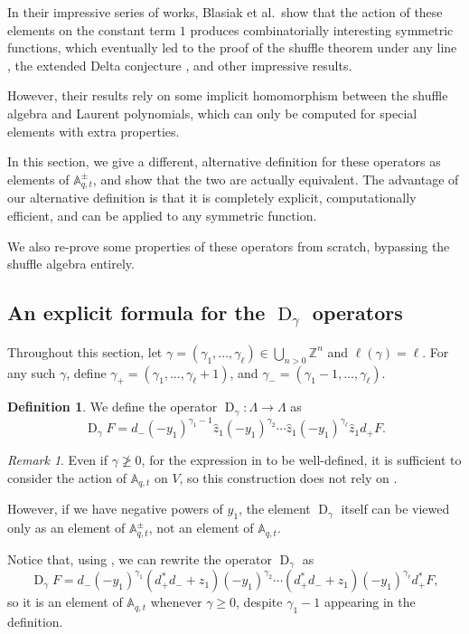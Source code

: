 \documentclass[reqno]{amsart}
\theoremstyle{plain}
\theoremstyle{definition}
\newtheorem{definition}[theorem]{Definition}
\theoremstyle{remark}
\newtheorem{remark}[theorem]{Remark}
\DeclareMathOperator{\D}{D}
\newcommand{\A}{\mathbb{A}}%
\newcommand{\z}{\widehat{z}}
\newcommand{\<}{\langle}
\renewcommand{\>}{\rangle}
\begin{document}
In their impressive series of works, Blasiak et al.\ show that the action of these elements on the constant term $1$ produces combinatorially interesting symmetric functions, which eventually led to the proof of the shuffle theorem under any line \cite{BHMPS2023ShuffleAnyLine}, the extended Delta conjecture \cite{BHMPS2023ProofExtendedDelta}, and other impressive results.

However, their results rely on some implicit homomorphism between the shuffle algebra and Laurent polynomials, which can only be computed for special elements with extra properties.

In this section, we give a different, alternative definition for these operators as elements of $\A_{q,t}^\pm$, and show that the two are actually equivalent. The advantage of our alternative definition is that it is completely explicit, computationally efficient, and can be applied to any symmetric function.

We also re-prove some properties of these operators from scratch, bypassing the shuffle algebra entirely.


\subsection{An explicit formula for the \texorpdfstring{$\D_\gamma$}{Dgamma} operators}

Throughout this section, let $\gamma = (\gamma_1, \dots, \gamma_\ell) \in \bigcup_{n > 0} \mathbb{Z}^n$ and $\ell(\gamma) = \ell$. For any such $\gamma$, define $\gamma_+ = (\gamma_1, \dots, \gamma_\ell + 1)$, and $\gamma_- = (\gamma_1 - 1, \dots, \gamma_\ell)$.

\begin{definition}
    \label{def:D_gamma}
    We define the operator $\D_\gamma \colon \Lambda \rightarrow \Lambda$ as \[ \D_\gamma F = d_- (-y_1)^{\gamma_1-1} \z_1 (-y_1)^{\gamma_2} \cdots \z_1 (-y_1)^{\gamma_\ell} \z_1 d_+ F. \] 
\end{definition}


\begin{remark}
    Even if $\gamma \not \geq 0$, for the expression in  to be well-defined, it is sufficient to consider the action of $\A_{q,t}$ on $V$, so this construction does not rely on .
    
    However, if we have negative powers of $y_1$, the element $\D_\gamma$ itself can be viewed only as an 
    element of $\A_{q,t}^\pm$, not an element of $\A_{q,t}$.

    Notice that, using , we can rewrite the operator $\D_\gamma$ as \[ \D_\gamma F = d_- (-y_1)^{\gamma_1} (d_+^* d_- + z_1) (-y_1)^{\gamma_2} \cdots (d_+^* d_- + z_1) (-y_1)^{\gamma_\ell} d_+^* F, \]
    so it is an element of $\A_{q,t}$ whenever $\gamma \geq 0$, despite $\gamma_1 - 1$ appearing in the definition.
\end{remark}
\end{document}

